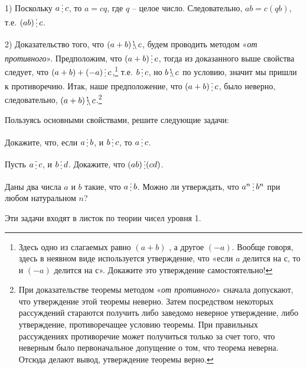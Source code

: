 
\begin{dok}
1) Поскольку $a\del c$, то $a = cq$, где $q$ – целое число. Следовательно, $ab = c(qb)$, т.е. $(ab)\del c$.

2) Доказательство того, что $(a + b)\ndel c$, будем проводить методом «\textit{от противного}». Предположим, что $(a + b)\del c$, тогда из доказанного выше свойства следует, что $(a + b) + (-a)\del c$,\footnote{Здесь одно из слагаемых равно $(a + b)$ , а другое $(-a)$. Вообще говоря, здесь в неявном виде используется утверждение, что «если $a$ делится на $с$, то и $(-a)$ делится на $с$». Докажите это утверждение самостоятельно!} т.е. $b\del c$, но $b \ndel c$ по условию, значит мы пришли к противоречию. Итак, наше предположение, что $(a + b)\del c$, было неверно,  следовательно, $(a + b) \ndel c$.\footnote{При доказательстве теоремы методом «\textit{от противного}» сначала допускают, что утверждение этой теоремы неверно. Затем посредством некоторых рассуждений стараются получить либо заведомо неверное утверждение, либо утверждение, противоречащее условию теоремы. При правильных рассуждениях противоречие может получиться только за счет того, что неверным было первоначальное допущение о том, что теорема неверна. Отсюда делают вывод, утверждение теоремы верно.}
\end{dok}

Пользуясь основными свойствами, решите следующие задачи:

\begin{thm}
	Докажите, что, если $a\del b$, и $b\del c$, то $a\del c$.
\end{thm}

\begin{thm}
	Пусть $a \del c$, и $b \del d$. Докажите, что $(ab) \del (cd)$.
\end{thm}

\begin{thm}
	Даны два числа $a$ и $b$ такие, что $a\del b$. Можно ли утверждать, что $a^n\del b^n$ при любом натуральном $n$?
\end{thm}

\begin{prim}
    Эти задачи входят в листок по теории чисел уровня 1.
\end{prim}

